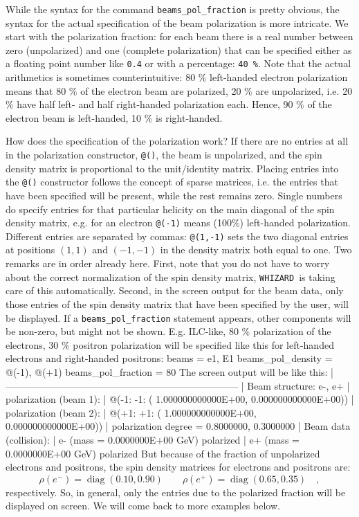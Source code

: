 \documentclass[12pt]{book}
\DeclareMathOperator{\diag}{diag}
\newenvironment{code}%
  {\begingroup\footnotesize
   \quote
   \Verbatim}%
  {\endVerbatim
   \endquote
   \endgroup\noindent}
\newcommand{\ttt}[1]{\texttt{#1}}
\newcommand{\whizard}{\ttt{WHIZARD}}
\begin{document}
While the syntax for the command \ttt{beams\_pol\_fraction} is pretty
obvious, the syntax for the actual specification of the beam
polarization is more intricate. We start with the polarization
fraction: for each beam there is a real number between zero
(unpolarized) and one (complete polarization) that can be specified
either as a floating point number like \ttt{0.4} or with a percentage:
\ttt{40 \%}. Note that the actual arithmetics is sometimes
counterintuitive: 80 \% left-handed electron polarization means that
80 \% of the electron beam are polarized, 20 \% are unpolarized,
i.e. 20 \% have half left- and half right-handed polarization
each. Hence, 90 \% of the electron beam is left-handed, 10 \% is
right-handed.

How does the specification of the polarization work? If there are no
entries at all in the polarization constructor, \ttt{@()}, the beam is
unpolarized, and the spin density matrix is proportional to the
unit/identity matrix. Placing entries into the \ttt{@()} constructor
follows the concept of sparse matrices, i.e. the entries that have
been specified will be present, while the rest remains zero. Single
numbers do specify entries for that particular helicity on the main
diagonal of the spin density matrix, e.g. for an electron \ttt{@(-1)}
means (100\%) left-handed polarization. Different entries are
separated by commas: \ttt{@(1,-1)} sets the two diagonal entries at
positions $(1,1)$ and $(-1,-1)$ in the density matrix both equal to
one. Two remarks are in order
already here. First, note that you do not have to worry about the
correct normalization of the spin density matrix, \whizard\ is taking
care of this automatically. Second, in the screen output for the beam
data, only those entries of the spin density matrix that have been
specified by the user, will be displayed. If a
\ttt{beams\_pol\_fraction} statement appears, other components will be
non-zero, but might not be shown. E.g. ILC-like, 80 \% polarization of
the electrons, 30 \% positron polarization will be specified like this
for left-handed electrons and right-handed positrons:
\begin{code}
beams = e1, E1
beams_pol_density = @(-1), @(+1)
beams_pol_fraction = 80%
\end{code}
The screen output will be like this:
\begin{code}
| ------------------------------------------------------------------------
| Beam structure: e-, e+
|   polarization (beam 1):
|     @(-1: -1: ( 1.000000000000E+00, 0.000000000000E+00))
|   polarization (beam 2):
|     @(+1: +1: ( 1.000000000000E+00, 0.000000000000E+00))
|   polarization degree = 0.8000000, 0.3000000
| Beam data (collision):
|   e-   (mass = 0.0000000E+00 GeV)  polarized
|   e+   (mass = 0.0000000E+00 GeV)  polarized
\end{code}
But because of the fraction of unpolarized electrons and positrons,
the spin density matrices for electrons and positrons are:
\[
\rho(e^-) = \diag \left ( 0.10, 0.90 \right) \qquad
\rho(e^+) = \diag \left ( 0.65, 0.35 \right) \quad ,
\]
respectively. So, in general, only the entries due to the polarized
fraction will be displayed on screen. We will come back to more
examples below.
\end{document}
